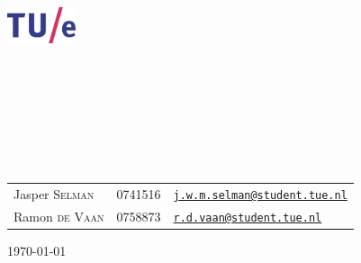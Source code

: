 \begin{titlepage}
	\begin{center}

		\includegraphics[width=0.15\textwidth]{Images/tuelogo}\\[1cm]

		\textsc{\LARGE \uni}\\[0.2cm]

		\textsc{\fase}\\[1.6cm]

        \textsc{\LARGE \vak}\\[0.5cm]

	\textsc{\vakcode}\\[0.5cm]

\HRule \\[0.4cm]
{ \huge \bfseries \essaytitle}\\[0.4cm]

\HRule \\[1.5cm]

    \begin{tabular}{l l l}
	Jasper \textsc{Selman} & 0741516 & \href{mailto:j.w.m.selman@student.tue.nl}{\texttt{j.w.m.selman@student.tue.nl}}\\
	Ramon \textsc{de Vaan} & 0758873 & \href{mailto:r.d.vaan@student.tue.nl}{\texttt{r.d.vaan@student.tue.nl}}\\
    \end{tabular}
		\vfill

		{\large \today} \\
		\stad

	\end{center}
\end{titlepage}